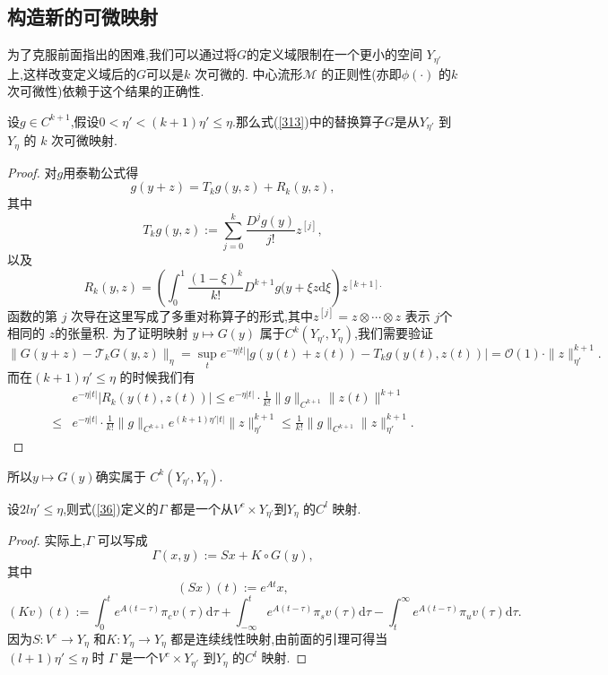 \subsection{构造新的可微映射}
为了克服前面指出的困难,我们可以通过将$G$的定义域限制在一个更小的空间 $Y_{\eta'}$ 上,这样改变定义域后的$G$可以是$k$ 次可微的. 中心流形$\mathcal{M}$ 的正则性(亦即$\phi(\cdot )$ 的$k$ 次可微性)依赖于这个结果的正确性.
\begin{lemma}
  设$g\in C^{k+1}$,假设$0<\eta'<(k+1)\eta'\le \eta$.那么式(\ref{313})中的替换算子$G$是从$Y_{\eta'}$ 到$Y_\eta$ 的 $k$ 次可微映射.
\end{lemma}
\begin{proof}
对$g$用泰勒公式得
\[
  g(y+z)=T_kg(y,z)+R_k(y,z),
\] 
其中
\[
  T_kg(y,z):=\sum_{j=0}^{k} \frac{D^{j}g(y)}{j!}z^{[j]},
\] 
以及
\[
  R_k(y,z)=\left( \int_0^{1} \frac{(1-\xi)^{k}}{k!}D^{k+1}g(y+\xi z \mathrm{d}\xi\right)z^{[k+1].} 
\] 
函数的第 $j$ 次导在这里写成了多重对称算子的形式,其中$z^{[j]}=z\otimes \cdots\otimes z$ 表示 $j$个相同的 $z$的张量积. 为了证明映射 $y\mapsto G(y)$ 属于$C^{k}\left(Y_{\eta'},Y_\eta\right)$,我们需要验证
\[
  \|G(y+z)-\mathcal{T}_k G(y,z)\|_{\eta}=\sup_{t}e^{-\eta\left| t \right| }\left| g\left( y(t)+z(t) \right) -T_k g\left( y(t),z(t) \right)  \right| =\mathcal{O}(1)\cdot \|z\|_{\eta'}^{k+1}.
\] 
而在$(k+1)\eta'\le \eta$ 的时候我们有
\begin{align*}
  &e^{-\eta\left| t \right| }\left| R_{k}\left( y(t),z(t) \right)  \right| \le e^{-\eta\left| t \right| }\cdot  \frac{1}{k!}\|g\|_{C^{k+1}}\|z(t)\|^{k+1}\\
  \le  & e^{-\eta\left| t \right| }\cdot  \frac{1}{k!}\|g\|_{C^{k+1}}e^{(k+1)\eta'\left| t \right| }\|z\|_{\eta'}^{k+1}\le \frac{1}{k!}\|g\|_{C^{k+1}}\|z\|^{k+1}_{\eta'}.
\end{align*}
\end{proof}
所以$y\mapsto G(y)$确实属于 $C^{k}\left( Y_{\eta'},Y_\eta \right) $.
\begin{corollary}
  设$2l \eta'\le \eta$,则式(\ref{36})定义的$\Gamma$ 都是一个从$V^{c}\times Y_{\eta'}$到$Y_\eta$ 的$C^{l}$ 映射.
\end{corollary}
\begin{proof}
  实际上,$\Gamma$ 可以写成
  \begin{equation}
    \Gamma(x,y):=Sx+K\circ G(y),\label{314}
  \end{equation}
  其中
   \begin{equation}
     (Sx)(t):=e^{At}x,
  \end{equation}
  \begin{equation}
    (Kv)(t):=\int_0^{t}e^{A(t-\tau)}\pi_cv(\tau)\mathrm{d}\tau+\int_{-\infty}^{t}e^{A(t-\tau)}\pi_sv(\tau)\mathrm{d}\tau-\int_{t}^{\infty}e^{A(t-\tau)}\pi_u v(\tau)\mathrm{d}\tau.
  \end{equation}
  因为$S:V^{c}\to Y_\eta$ 和$K:Y_\eta\to Y_\eta$ 都是连续线性映射,由前面的引理可得当$(l+1)\eta'\le \eta$ 时 $\Gamma$ 是一个$V^{c}\times Y_{\eta'}$ 到$Y_{\eta}$ 的$C^{l}$ 映射.
\end{proof}
